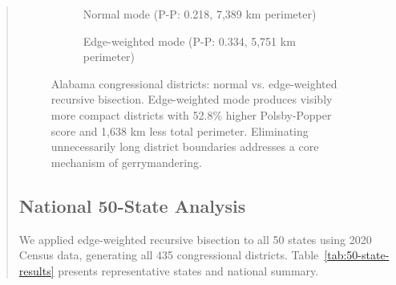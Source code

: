 \documentclass[11pt,twocolumn]{article}
\begin{document}
\begin{abstract}
\begin{figure}[t]
\centering
\begin{subfigure}[b]{0.48\textwidth}
    \centering
    \caption{Normal mode (P-P: 0.218, 7,389 km perimeter)}
\end{subfigure}
\hfill
\begin{subfigure}[b]{0.48\textwidth}
    \centering
    \caption{Edge-weighted mode (P-P: 0.334, 5,751 km perimeter)}
\end{subfigure}
\caption{Alabama congressional districts: normal vs. edge-weighted recursive bisection. Edge-weighted mode produces visibly more compact districts with 52.8\% higher Polsby-Popper score and 1,638 km less total perimeter. Eliminating unnecessarily long district boundaries addresses a core mechanism of gerrymandering.}
\label{fig:alabama-comparison}
\end{figure}

\subsection{National 50-State Analysis}

We applied edge-weighted recursive bisection to all 50 states using 2020 Census data, generating all 435 congressional districts. Table~\ref{tab:50-state-results} presents representative states and national summary.


\end{abstract}
\end{document}
